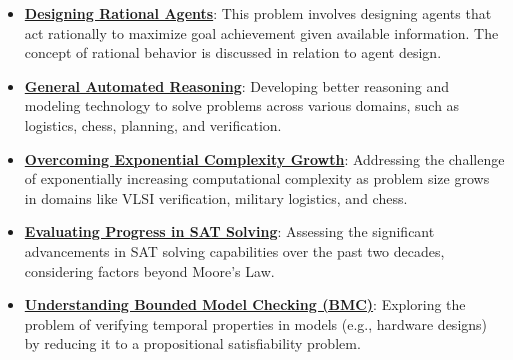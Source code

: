 \documentclass{article}%
\begin{document}
\begin{itemize}[leftmargin=*]
\item \href{https://purdue.brightspace.com/d2l/common/assets/pdfjs-d2l-dist/1.0.14-legacy/web/viewer.html?file=%2Fcontent%2Fenforced%2F1095467-wl.202510.CS.24300.001%2F14L1-DepthFS.pdf%3Fou%3D1095467&lang=en-us&container=d2l-fileviewer-rendered-pdf&fullscreen=d2l-fileviewer-rendered-pdf-dialog&height=667#page=39}{\textbf{Designing Rational Agents}}: This problem involves designing agents that act rationally to maximize goal achievement given available information. The concept of rational behavior is discussed in relation to agent design.%
\end{itemize}%
\begin{itemize}[leftmargin=*]%
\item \href{https://purdue.brightspace.com/d2l/common/assets/pdfjs-d2l-dist/1.0.14-legacy/web/viewer.html?file=%2Fcontent%2Fenforced%2F1095467-wl.202510.CS.24300.001%2F15L2-SAT.pdf%3Fou%3D1095467&lang=en-us&container=d2l-fileviewer-rendered-pdf&fullscreen=d2l-fileviewer-rendered-pdf-dialog&height=667#page=3}{\textbf{General Automated Reasoning}}: Developing better reasoning and modeling technology to solve problems across various domains, such as logistics, chess, planning, and verification.%
\item \href{https://purdue.brightspace.com/d2l/common/assets/pdfjs-d2l-dist/1.0.14-legacy/web/viewer.html?file=%2Fcontent%2Fenforced%2F1095467-wl.202510.CS.24300.001%2F15L2-SAT.pdf%3Fou%3D1095467&lang=en-us&container=d2l-fileviewer-rendered-pdf&fullscreen=d2l-fileviewer-rendered-pdf-dialog&height=667#page=4}{\textbf{Overcoming Exponential Complexity Growth}}: Addressing the challenge of exponentially increasing computational complexity as problem size grows in domains like VLSI verification, military logistics, and chess.%
\item \href{https://purdue.brightspace.com/d2l/common/assets/pdfjs-d2l-dist/1.0.14-legacy/web/viewer.html?file=%2Fcontent%2Fenforced%2F1095467-wl.202510.CS.24300.001%2F15L2-SAT.pdf%3Fou%3D1095467&lang=en-us&container=d2l-fileviewer-rendered-pdf&fullscreen=d2l-fileviewer-rendered-pdf-dialog&height=667#page=5}{\textbf{Evaluating Progress in SAT Solving}}: Assessing the significant advancements in SAT solving capabilities over the past two decades, considering factors beyond Moore's Law.%
\item \href{https://purdue.brightspace.com/d2l/common/assets/pdfjs-d2l-dist/1.0.14-legacy/web/viewer.html?file=%2Fcontent%2Fenforced%2F1095467-wl.202510.CS.24300.001%2F15L2-SAT.pdf%3Fou%3D1095467&lang=en-us&container=d2l-fileviewer-rendered-pdf&fullscreen=d2l-fileviewer-rendered-pdf-dialog&height=667#page=6}{\textbf{Understanding Bounded Model Checking (BMC)}}: Exploring the problem of verifying temporal properties in models (e.g., hardware designs) by reducing it to a propositional satisfiability problem.%

\end{itemize}
\end{document}
